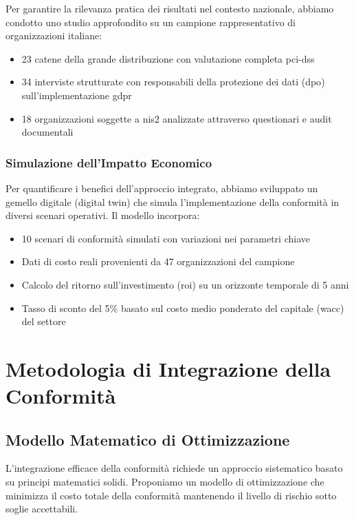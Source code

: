 Per garantire la rilevanza pratica dei risultati nel contesto nazionale, abbiamo condotto uno studio approfondito su un campione rappresentativo di organizzazioni italiane:

\begin{itemize}
    \item 23 catene della grande distribuzione con valutazione completa \gls{pci-dss}
    \item 34 interviste strutturate con responsabili della protezione dei dati (\gls{dpo}) sull'implementazione \gls{gdpr}
    \item 18 organizzazioni soggette a \gls{nis2} analizzate attraverso questionari e audit documentali
\end{itemize}

\subsubsection{Simulazione dell'Impatto Economico}

Per quantificare i benefici dell'approccio integrato, abbiamo sviluppato un gemello digitale (digital twin) che simula l'implementazione della conformità in diversi scenari operativi. Il modello incorpora:

\begin{itemize}
    \item 10 scenari di conformità simulati con variazioni nei parametri chiave
    \item Dati di costo reali provenienti da 47 organizzazioni del campione
    \item Calcolo del ritorno sull'investimento (\gls{roi}) su un orizzonte temporale di 5 anni
    \item Tasso di sconto del 5\% basato sul costo medio ponderato del capitale (\gls{wacc}) del settore
\end{itemize}

\section{Metodologia di Integrazione della Conformità}
\label{sec:4.3_metodologia}

\subsection{Modello Matematico di Ottimizzazione}
\label{subsec:4.3.1_modello}

L'integrazione efficace della conformità richiede un approccio sistematico basato su principi matematici solidi. Proponiamo un modello di ottimizzazione che minimizza il costo totale della conformità mantenendo il livello di rischio sotto soglie accettabili.

